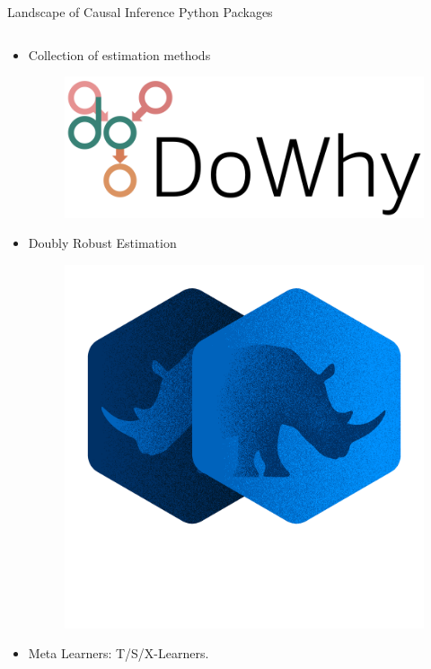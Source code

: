 \documentclass[aspectratio=169]{beamer}
\begin{document}
\begin{frame}{Landscape of Causal Inference Python Packages}
	\begin{columns}
		\begin{column}[T]{0.55 \textwidth}
			\begin{itemize}
				\item Collection of estimation methods
					\begin{figure}
						\includegraphics[scale=0.2]{imgs/dowhy.png}
					\end{figure}
				\item Doubly Robust Estimation
					\begin{figure}
						\includegraphics[scale=0.1]{imgs/doubleml.png}
					\end{figure}
				\item Meta Learners: T/S/X-Learners.

\end{itemize}
\end{column}
\end{columns}
\end{frame}
\end{document}
